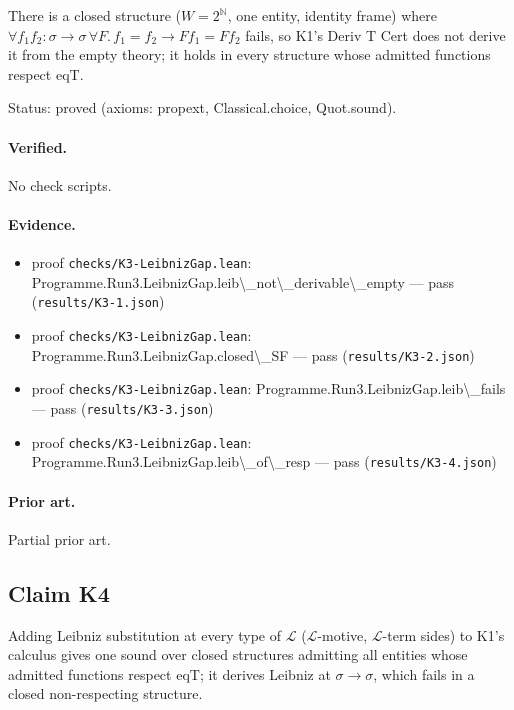 \documentclass{article}
\begin{document}
There is a closed structure ($W=2^{\mathbb N}$, one entity, identity frame) where $\forall f_1f_2{:}\sigma\to\sigma\,\forall F.\,f_1=f_2\to Ff_1=Ff_2$ fails, so K1's Deriv T Cert does not derive it from the empty theory; it holds in every structure whose admitted functions respect eqT.

Status: proved (axioms: propext, Classical.choice, Quot.sound).

\paragraph{Verified.}
No check scripts.

\paragraph{Evidence.}
\begin{itemize}
\item proof \texttt{checks/K3-LeibnizGap.lean}: Programme.Run3.LeibnizGap.leib\textbackslash{}\_not\textbackslash{}\_derivable\textbackslash{}\_empty --- pass (\texttt{results/K3-1.json})
\item proof \texttt{checks/K3-LeibnizGap.lean}: Programme.Run3.LeibnizGap.closed\textbackslash{}\_SF --- pass (\texttt{results/K3-2.json})
\item proof \texttt{checks/K3-LeibnizGap.lean}: Programme.Run3.LeibnizGap.leib\textbackslash{}\_fails --- pass (\texttt{results/K3-3.json})
\item proof \texttt{checks/K3-LeibnizGap.lean}: Programme.Run3.LeibnizGap.leib\textbackslash{}\_of\textbackslash{}\_resp --- pass (\texttt{results/K3-4.json})
\end{itemize}

\paragraph{Prior art.} Partial prior art.

\subsection*{Claim K4}

Adding Leibniz substitution at every type of $\mathcal L$ ($\mathcal{L}$-motive, $\mathcal{L}$-term sides) to K1's calculus gives one sound over closed structures admitting all entities whose admitted functions respect eqT; it derives Leibniz at $\sigma\to\sigma$, which fails in a closed non-respecting structure.
\end{document}
